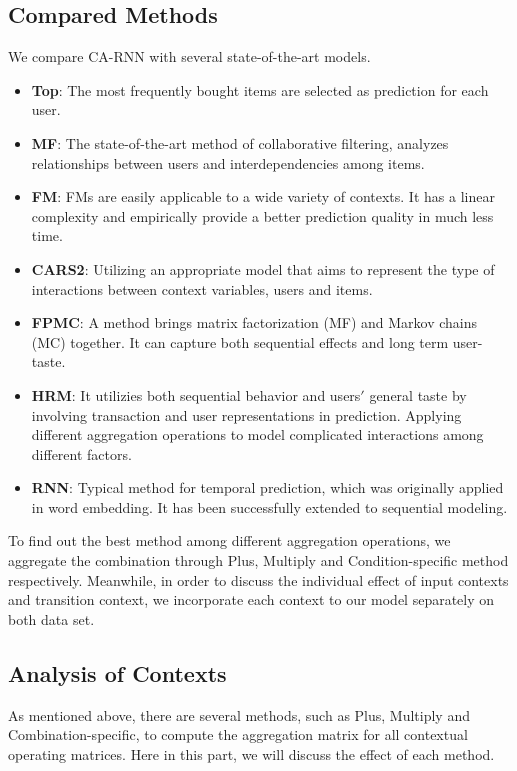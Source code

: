 \documentclass[conference]{IEEEtran}
\begin{document}
\subsection{Compared Methods}
We compare CA-RNN with several state-of-the-art models.
\begin{itemize}
\item \textbf{Top}: 
The most frequently bought items are selected as prediction for each user.
\item \textbf{MF}: 
The state-of-the-art method of collaborative filtering, analyzes relationships between users and interdependencies among items.
\item \textbf{FM}: 
FMs are easily applicable to a wide variety of contexts. It has a linear complexity and empirically provide a better prediction quality in much less time.
\item \textbf{CARS2}: 
Utilizing an appropriate model that aims to represent the type of interactions between context variables, users and items.
\item \textbf{FPMC}: 
A method brings matrix factorization (MF) and Markov chains (MC) together. It can capture
both sequential effects and long term user-taste.
\item \textbf{HRM}: 
It utilizies both sequential behavior and users$'$ general taste by involving transaction and user representations in prediction. Applying different aggregation operations to model complicated interactions among different factors.
\item \textbf{RNN}: 
Typical method for temporal prediction, which was originally applied in word embedding. It has been successfully extended to sequential modeling. 


\end{itemize}
 To find out the best method among different aggregation operations, we aggregate the combination through Plus, Multiply and Condition-specific method respectively. Meanwhile, in order to discuss the individual effect of input contexts and transition context, we incorporate each context to our model separately on both data set. 




\subsection{Analysis of Contexts}
As mentioned above, there are several methods, such as Plus, Multiply and Combination-specific, to compute the aggregation matrix for all contextual operating matrices. Here in this part, we will discuss the effect of each method.
\end{document}
